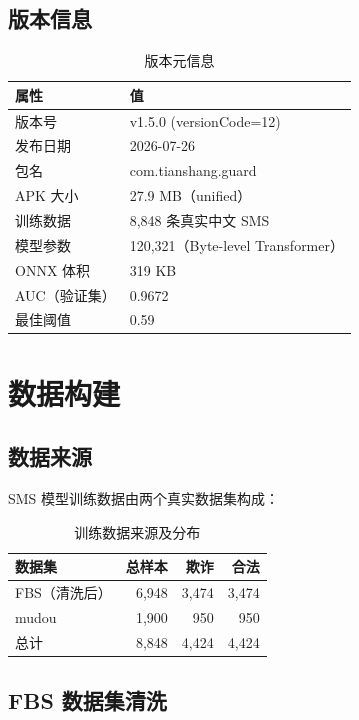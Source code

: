 \documentclass[11pt,a4paper]{article}
\begin{document}
\subsection{版本信息}

\begin{table}[H]
\centering
\caption{版本元信息}
\begin{tabular}{ll}
\toprule
属性 & 值 \\
\midrule
版本号 & v1.5.0 (versionCode=12) \\
发布日期 & 2026-07-26 \\
包名 & com.tianshang.guard \\
APK 大小 & 27.9 MB（unified） \\
训练数据 & 8,848 条真实中文 SMS \\
模型参数 & 120,321（Byte-level Transformer） \\
ONNX 体积 & 319 KB \\
AUC（验证集） & 0.9672 \\
最佳阈值 & 0.59 \\
\bottomrule
\end{tabular}
\end{table}

\section{数据构建}

\subsection{数据来源}

SMS 模型训练数据由两个真实数据集构成：

\begin{table}[H]
\centering
\caption{训练数据来源及分布}
\begin{tabular}{lrrr}
\toprule
数据集 & 总样本 & 欺诈 & 合法 \\
\midrule
FBS（清洗后） & 6,948 & 3,474 & 3,474 \\
mudou & 1,900 & 950 & 950 \\
\midrule
总计 & 8,848 & 4,424 & 4,424 \\
\bottomrule
\end{tabular}
\end{table}

\subsection{FBS 数据集清洗}
\end{document}
